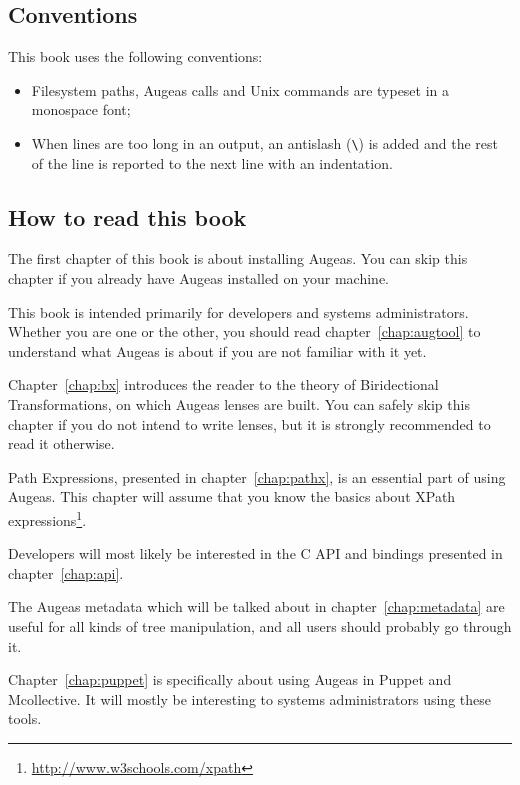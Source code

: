 \subsection{Conventions}

This book uses the following conventions:
\begin{itemize}
  \item
    Filesystem paths, Augeas calls and Unix commands are typeset in a monospace font;
  \item
    When lines are too long in an output, an antislash (\verb!\!) is added and the rest of the line is reported to the next line with an indentation.
\end{itemize}




\subsection{How to read this book}

The first chapter of this book is about installing Augeas. You can skip this chapter if you already have Augeas installed on your machine.

This book is intended primarily for developers and systems administrators.
 Whether you are one or the other, you should read chapter~\ref{chap:augtool} to understand what Augeas is about if you are not familiar with it yet.

Chapter~\ref{chap:bx} introduces the reader to the theory of Biridectional Transformations, on which Augeas lenses are built. You can safely skip this chapter if you do not intend to write lenses, but it is strongly recommended to read it otherwise.

Path Expressions, presented in chapter~\ref{chap:pathx}, is an essential part of using Augeas. This chapter will assume that you know the basics about XPath expressions\footnote{\url{http://www.w3schools.com/xpath}}.

Developers will most likely be interested in the C API and bindings presented in chapter~\ref{chap:api}.

The Augeas metadata which will be talked about in chapter~\ref{chap:metadata} are useful for all kinds of tree manipulation, and all users should probably go through it.

Chapter~\ref{chap:puppet} is specifically about using Augeas in Puppet and Mcollective. It will mostly be interesting to systems administrators using these tools.

